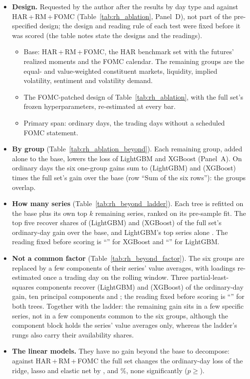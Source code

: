 \begin{itemize}
\item \textbf{Design.} Requested by the author after the results by day type and against HAR\,+\,RM\,+\,FOMC
  (Table~\ref{tab:rh_ablation}, Panel~D), not part of the pre-specified design; the design and reading rule of each
  test were fixed before it was scored (the table notes state the designs and the readings).
  \begin{itemize}
  \item Base: HAR\,+\,RM\,+\,FOMC, the HAR benchmark set with the futures' realized moments and the FOMC calendar. The
    remaining groups are the equal- and value-weighted constituent markets, liquidity, implied volatility, sentiment
    and volatility demand.
  \item The FOMC-patched design of Table~\ref{tab:rh_ablation}, with the full set's frozen hyperparameters,
    re-estimated at every bar.
  \item Primary span: ordinary days, the trading days without a scheduled FOMC statement.
  \end{itemize}
\item \textbf{By group} (Table~\ref{tab:rh_ablation_beyond}). Each remaining group, added alone to the base, lowers the
  loss of LightGBM and XGBoost (Panel~A). On ordinary days the six one-group gains sum to \rhabLgbmBeyondRatioOrd{}
  (LightGBM) and \rhabXgbBeyondRatioOrd{} (XGBoost) times the full set's gain over the base (row ``Sum of the six
  rows''): the groups overlap.
\item \textbf{How many series} (Table~\ref{tab:rh_beyond_ladder}). Each tree is refitted on the base plus its own top
  $k$ remaining series, ranked on its \rhldRankYear{} pre-sample fit. The top five recover shares of
  \rhbyLLgbmKFiveOrdR{} (LightGBM) and \rhbyLXgbKFiveOrdR{} (XGBoost) of the full set's ordinary-day gain over the
  base, and LightGBM's top series alone \rhbyLLgbmKOneOrdR. The reading fixed before scoring is ``\rhbyLXgbReading''
  for XGBoost and ``\rhbyLLgbmReading'' for LightGBM.
\item \textbf{Not a common factor} (Table~\ref{tab:rh_beyond_factor}). The six groups are replaced by a few components
  of their series' value averages, with loadings re-estimated once a trading day on the rolling window. Three
  partial-least-squares components recover \rhbyFLgbmPlsThreeOrdR{} (LightGBM) and \rhbyFXgbPlsThreeOrdR{} (XGBoost)
  of the ordinary-day gain, ten principal components \rhbyFLgbmPcaTenOrdR{} and \rhbyFXgbPcaTenOrdR; the reading
  fixed before scoring is ``\rhbyFLgbmReading'' for both trees. Together with the ladder: the remaining gain sits in a
  few specific series, not in a few components common to the six groups, although the component block holds the
  series' value averages only, whereas the ladder's rungs also carry their availability shares.
\item \textbf{The linear models.} They have no gain beyond the base to decompose: against HAR\,+\,RM\,+\,FOMC the full
  set changes the ordinary-day loss of the ridge, lasso and elastic net by \rhabRidgeFullVsAddRmFomcOrdPct,
  \rhabLassoFullVsAddRmFomcOrdPct{} and \rhabEnetFullVsAddRmFomcOrdPct\%, none significantly
  ($p \geq{}$\rhabLinFullVsAddRmFomcOrdPMin).
\end{itemize}
